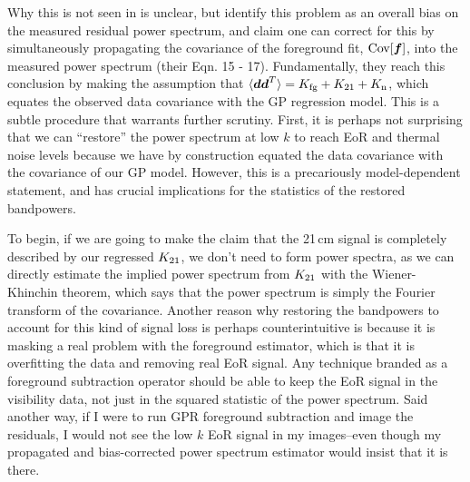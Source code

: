 \documentclass[a4paper,fleqn,usenatbib]{mnras}
\def\d{\boldsymbol{d}}
\def\f{\boldsymbol{f}}
\def\Cov{{\rm Cov}}
\def\Kto{K_{\rm 21}}
\begin{document}
Why this is not seen in  is unclear, but  identify this problem as an overall bias on the measured residual power spectrum, and claim one can correct for this by simultaneously propagating the covariance of the foreground fit, $\Cov[\f]$, into the measured power spectrum (their Eqn. 15 - 17).
Fundamentally, they reach this conclusion by making the assumption that $\langle \d\d^T\rangle = K_{\rm fg} + K_{\rm 21} + K_{\rm n}$, which equates the observed data covariance with the GP regression model.
This is a subtle procedure that warrants further scrutiny.
First, it is perhaps not surprising that we can ``restore'' the power spectrum at low $k$ to reach EoR and thermal noise levels because we have by construction equated the data covariance with the covariance of our GP model.
However, this is a precariously model-dependent statement, and has crucial implications for the statistics of the restored bandpowers.

To begin, if we are going to make the claim that the 21\,cm signal is completely described by our regressed $\Kto$, we don't need to form power spectra, as we can directly estimate the implied power spectrum from $\Kto$ with the Wiener-Khinchin theorem, which says that the power spectrum is simply the Fourier transform of the covariance.
Another reason why restoring the bandpowers to account for this kind of signal loss is perhaps counterintuitive is because it is masking a real problem with the foreground estimator, which is that it is overfitting the data and removing real EoR signal.
Any technique branded as a foreground subtraction operator should be able to keep the EoR signal in the visibility data, not just in the squared statistic of the power spectrum.
Said another way, if I were to run GPR foreground subtraction and image the residuals, I would not see the low $k$ EoR signal in my images--even though my propagated and bias-corrected power spectrum estimator would insist that it is there.
\end{document}
